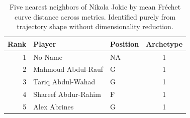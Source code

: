 \begin{table}[htbp]
  \centering\small
  \begin{tabular}{rllc}
    \toprule
    Rank & Player & Position & Archetype \\
    \midrule
    1 & No Name & NA & 1 \\
    2 & Mahmoud Abdul-Rauf & G & 1 \\
    3 & Tariq Abdul-Wahad & G & 1 \\
    4 & Shareef Abdur-Rahim & F & 1 \\
    5 & Alex Abrines & G & 1 \\
    \bottomrule
  \end{tabular}
  \caption{Five nearest neighbors of Nikola Jokic by mean Fr\'{e}chet curve distance across metrics. Identified purely from trajectory shape without dimensionality reduction.}
\end{table}


